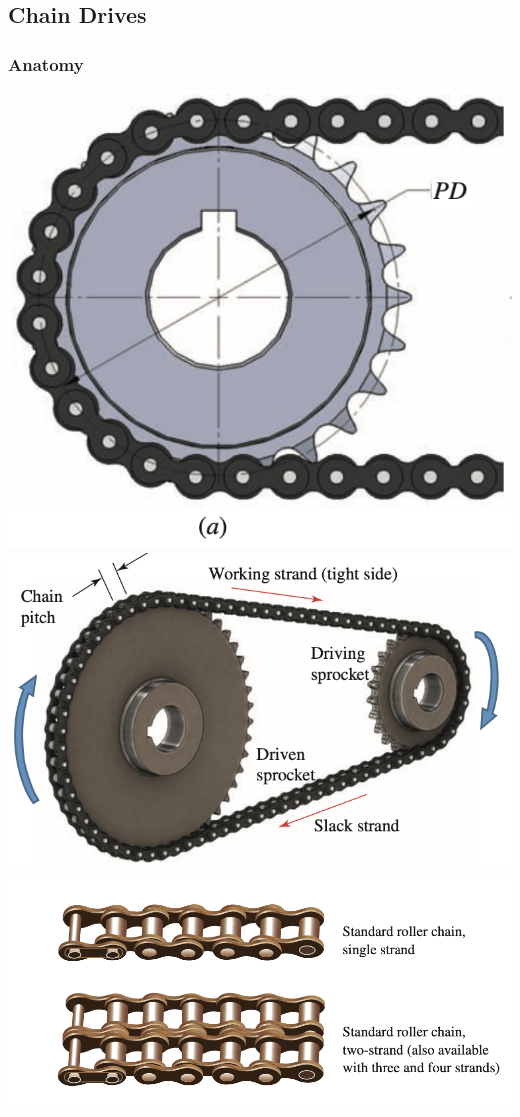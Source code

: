 \documentclass[11pt, fleqn]{article}
\begin{document}
\subsection{Chain Drives}
\subsubsection{Anatomy}
\includegraphics[scale=0.3]{Belts/chain-drive_pd.png}
\includegraphics[scale=0.7]{Belts/chain-drives.png}\\
\includegraphics[scale=0.6]{Belts/chains.png}
\end{document}
